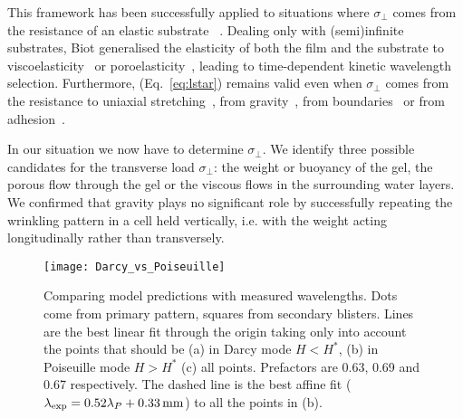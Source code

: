 \documentclass[twocolumn,superscriptaddress,showpacs,preprintnumbers,
amsmath,amssymb,prl]{revtex4-1}
\begin{document}
This framework has been successfully applied to situations where $\sigma_{\perp}$ comes from the resistance of an elastic substrate ~\cite{Gough1940, Bijlaard1946}. Dealing only with (semi)infinite substrates, Biot generalised the elasticity of both the film and the substrate to viscoelasticity~\cite{Biot1957} or poroelasticity~\cite{Biot1964}, leading to time-dependent kinetic wavelength selection. Furthermore, (Eq.~\ref{eq:lstar}) remains valid even when $\sigma_{\perp}$ comes from the resistance to uniaxial stretching~\cite{Cerda2003}, from gravity~\cite{Smoluchowski1910, Kolinski2009, Vella2009, Pineirua2013, Lucantonio2013}, from boundaries~\cite{Vandeparre2011a, Li2013} or from adhesion~\cite{Vella2009a}.

In our situation we now have to determine $\sigma_\perp$. We identify three possible candidates for the transverse load $\sigma_\perp$: the weight or buoyancy of the gel, the porous flow through the gel or the viscous flows in the surrounding water layers. We confirmed that gravity plays no significant role by successfully repeating the wrinkling pattern in a cell held vertically, i.e. with the weight acting longitudinally rather than transversely.


\begin{figure*}
	\texttt{[image: Darcy\_vs\_Poiseuille]}
	\caption{Comparing model predictions with measured wavelengths. Dots come from primary pattern, squares from secondary blisters. Lines are the best linear fit through the origin taking only into account the points that should be (a) in Darcy mode $H<H^*$, (b) in Poiseuille mode $H>H^*$ (c) all points. Prefactors are 0.63, 0.69 and 0.67 respectively. The dashed line is the best affine fit ($\lambda_{\rm exp}=0.52\lambda_{P}+\SI{0.33}{\milli\metre}$) to all the points in (b).}
	\label{fig:DarcyPoiseuille}
\end{figure*}
\end{document}
